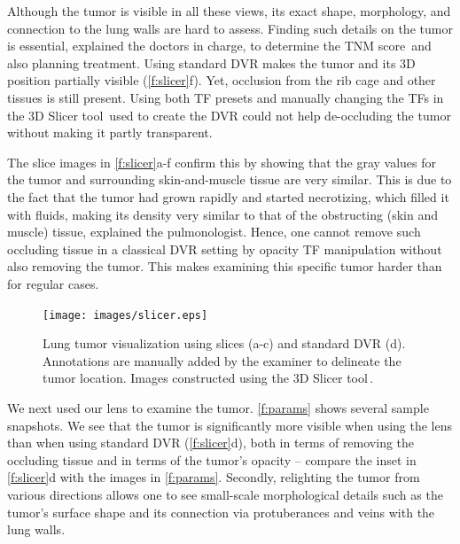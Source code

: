  Although the tumor is visible in all these views, its exact shape, morphology, and connection to the lung walls are hard to assess. Finding such details on the tumor is essential, explained the doctors in charge, to determine the TNM score\,\cite{brierley} and also planning treatment. Using standard DVR makes the tumor and its 3D position partially visible (\autoref{f:slicer}f). Yet, occlusion from the rib cage and other tissues is still present. Using both TF presets and manually changing the TFs in the 3D Slicer tool\,\cite{slicer} used to create the DVR could not help de-occluding the tumor without making it partly transparent.
 
  The slice images in \autoref{f:slicer}a-f confirm this by showing that the gray values for the tumor and surrounding skin-and-muscle tissue are very similar. This is due to the fact that the tumor had grown rapidly and started necrotizing, which filled it with fluids, making its density very similar to that of the obstructing (skin and muscle) tissue, explained the pulmonologist. Hence, one cannot remove such occluding tissue in a classical DVR setting by opacity TF manipulation without also removing the tumor. This makes examining this specific tumor harder than for regular cases.

\begin{figure}
\centering
\texttt{[image: images/slicer.eps]}
\caption[Lung tumor visualization using slices and standard DVR.]{Lung tumor visualization using slices (a-c) and standard DVR (d). Annotations are manually added by the examiner to delineate the tumor location. Images constructed using the 3D Slicer tool\,\cite{slicer}.}
\label{f:slicer}
\end{figure}

We next used our lens to examine the tumor. \autoref{f:params} shows several sample snapshots. We see that the tumor is significantly more visible when using the lens than when using standard DVR (\autoref{f:slicer}d), both in terms of removing the occluding tissue and in terms of the tumor's opacity -- compare the inset in \autoref{f:slicer}d with the images in \autoref{f:params}. Secondly, relighting the tumor from various directions allows one to see small-scale morphological details such as the tumor's surface shape and its connection via protuberances and veins with the lung walls.

